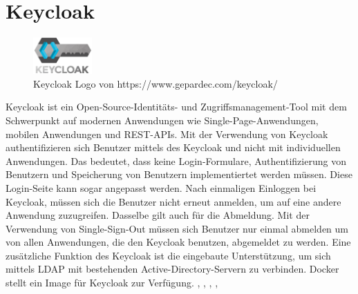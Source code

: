 \section{Keycloak}
\begin{figure}
  \begin{center}
    \includegraphics[width=0.2\textwidth]{pics/KeyCloak_logopng.png}
    \caption{Keycloak Logo von https://www.gepardec.com/keycloak/}
  \end{center}
\end{figure}
Keycloak ist ein Open-Source-Identitäts- und Zugriffsmanagement-Tool mit dem Schwerpunkt auf 
modernen Anwendungen wie Single-Page-Anwendungen, mobilen Anwendungen und REST-APIs.
Mit der Verwendung von Keycloak authentifizieren sich Benutzer mittels des Keycloak und nicht mit 
individuellen Anwendungen. Das bedeutet, dass keine Login-Formulare, Authentifizierung von Benutzern 
und Speicherung von Benutzern implementiertet werden müssen. Diese Login-Seite kann sogar angepasst werden.
Nach einmaligen Einloggen bei Keycloak, müssen sich die Benutzer nicht erneut anmelden, um auf 
eine andere Anwendung zuzugreifen. Dasselbe gilt auch für die Abmeldung. Mit der Verwendung von
Single-Sign-Out müssen sich Benutzer nur einmal abmelden um von allen Anwendungen, 
die den Keycloak benutzen, abgemeldet zu werden.  
\newline
\newline
Eine zusätzliche Funktion des Keycloak ist die eingebaute Unterstützung, um sich mittels LDAP mit 
bestehenden Active-Directory-Servern zu verbinden. 
Docker stellt ein Image für Keycloak zur Verfügung. \cite{noauthor_keycloak_nodate-1}, \cite{noauthor_quarkus_nodate}, \cite{noauthor_keycloakkeycloak_nodate}, \cite{noauthor_keycloak_2022}, \cite{noauthor_mit_2020}

